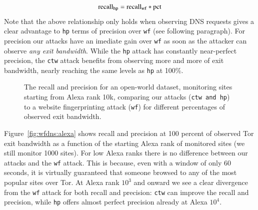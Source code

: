 \begin{equation}
	\label{eq:hprecall}
	\textnormal{recall}_{\texttt{hp}} = \textnormal{recall}_{\texttt{wf}} * \textnormal{pct}
\end{equation}
Note that the above relationship only holds when observing DNS requests gives
a clear advantage to \texttt{hp} terms of precision over \texttt{wf} (see
following paragraph).
For precision our attacks have an imediate gain over \texttt{wf} as soon as
the attacker can observe \emph{any exit bandwidth}.
While the \texttt{hp} attack has constantly near-perfect precision, the
\texttt{ctw} attack benefits from observing more and more of exit bandwidth,
nearly reaching the same levels as \texttt{hp} at 100\%.


\begin{figure}[t]
\centering
{}
\caption{The recall and precision for an open-world dataset, monitoring sites
starting from Alexa rank 10k, comparing our attacks (\texttt{ctw and
 \texttt{hp}}) to a website fingerprinting attack (\texttt{wf}) for different
 percentages of observed exit bandwidth. }
\label{fig:wfdns:torpct}
\end{figure}


Figure~\ref{fig:wfdns:alexa} shows recall and precision at 100 percent of
observed Tor exit bandwidth as a function of the starting Alexa rank of
monitored sites (we still monitor 1000 sites).
For low Alexa ranks there is no difference between our attacks and the
\texttt{wf} attack. This is because, even with a window of only 60 seconds,
it is virtually guaranteed that someone browsed to any of the most popular
sites over Tor. At Alexa rank $10^3$ and onward we see a clear divergence from
the \texttt{wf} attack for both recall and precision:
\texttt{ctw} can improve the recall and precision, while
\texttt{hp} offers almost perfect precision already at Alexa $10^4$.

